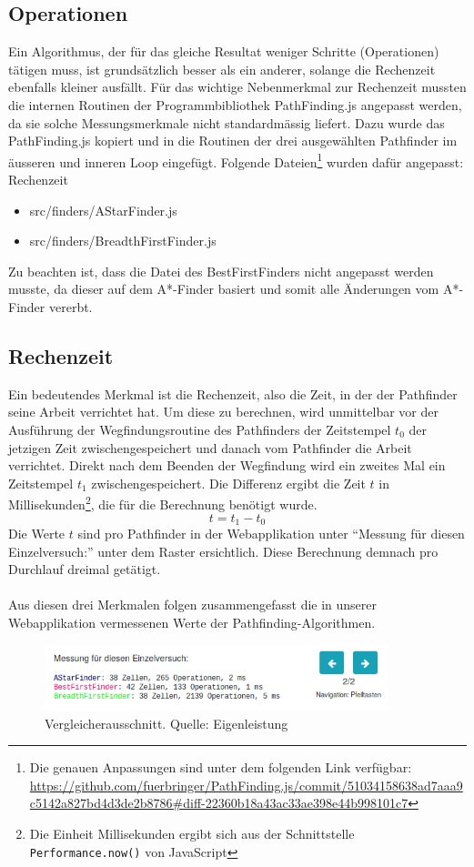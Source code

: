 \documentclass[12pt,a4paper,german]{report}
\begin{document}
\subsection{Operationen}
Ein Algorithmus, der für das gleiche Resultat weniger Schritte (Operationen) tätigen muss, ist grundsätzlich besser als ein anderer, solange die Rechenzeit ebenfalls kleiner ausfällt. Für das wichtige Nebenmerkmal zur Rechenzeit mussten die internen Routinen der Programmbibliothek PathFinding.js angepasst werden, da sie solche Messungsmerkmale nicht standardmässig liefert. Dazu wurde das PathFinding.js kopiert und in die Routinen der drei ausgewählten Pathfinder im äusseren und inneren Loop eingefügt. Folgende Dateien\footnote{Die genauen Anpassungen sind unter dem folgenden Link verfügbar: \url{https://github.com/fuerbringer/PathFinding.js/commit/51034158638ad7aaa9c5142a827bd4d3de2b8786\#diff-22360b18a43ac33ae398e44b998101c7}} wurden dafür angepasst:
{Rechenzeit}
\begin{itemize}
\item{src/finders/AStarFinder.js}
\item{src/finders/BreadthFirstFinder.js}
\end{itemize}
Zu beachten ist, dass die Datei des BestFirstFinders nicht angepasst werden musste, da dieser auf dem A*-Finder basiert und somit alle Änderungen vom A*-Finder vererbt.

\subsection{Rechenzeit}
Ein bedeutendes Merkmal ist die Rechenzeit, also die Zeit, in der der Pathfinder seine Arbeit verrichtet hat. 
Um diese zu berechnen, wird unmittelbar vor der Ausführung der Wegfindungsroutine des Pathfinders der Zeitstempel $t_0$ der jetzigen Zeit zwischengespeichert und danach vom Pathfinder die Arbeit verrichtet. 
Direkt nach dem Beenden der Wegfindung wird ein zweites Mal ein Zeitstempel $t_1$ zwischengespeichert. Die Differenz ergibt die Zeit $t$ in Millisekunden\footnote{Die Einheit Millisekunden ergibt sich aus der Schnittstelle \texttt{Performance.now()} von JavaScript}, die für die Berechnung benötigt wurde.
\begin{equation}
  t = t_1 - t_0
\end{equation}
Die Werte $t$ sind pro Pathfinder in der Webapplikation unter ``Messung für diesen Einzelversuch:'' unter dem Raster ersichtlich. Diese Berechnung demnach pro Durchlauf dreimal getätigt.
\\\\
Aus diesen drei Merkmalen folgen zusammengefasst die in unserer Webapplikation vermessenen Werte der Pathfinding-Algorithmen.
\begin{figure}[h]
  \centering
  \includegraphics[width=10cm]{measurements_single}
  \caption[Ausschnitt aus dem Pathfinding-Vergleicher für einzelne Vergleiche.]{Vergleicherausschnitt. Quelle: Eigenleistung}
  \label{fig:gui_konzept_comparator}
\end{figure}
\end{document}
